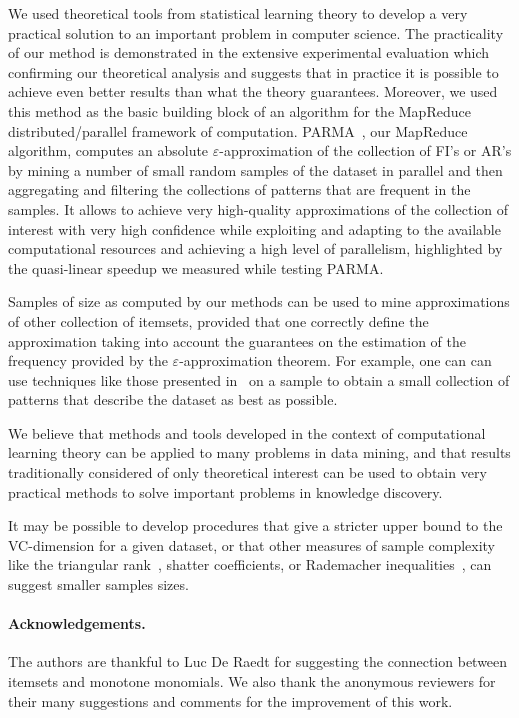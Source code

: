 We used theoretical tools from statistical learning theory to develop a very
practical solution to an important problem in computer science. The practicality
of our method is demonstrated in the extensive experimental evaluation which
confirming our theoretical analysis and suggests that in practice it is possible
to achieve even better results than what the theory guarantees. Moreover, we
used this method as the basic building block of an algorithm for the
MapReduce~\cite{DeanS04} distributed/parallel framework of computation.
PARMA~\cite{RiondatoDFU12}, our MapReduce algorithm, computes an absolute
$\varepsilon$-approximation of the collection of FI's or AR's by mining a number
of small random samples of the dataset in parallel and then aggregating and
filtering the collections of patterns that are frequent in the samples. It
allows to achieve very high-quality approximations of the collection of interest
with very high confidence while exploiting and adapting to the available
computational resources and achieving a high level of parallelism, highlighted 
by the quasi-linear speedup we measured while testing PARMA.

Samples of size as computed by our methods can be used to mine approximations
of other collection of itemsets, provided that one correctly define the
approximation taking into account the guarantees on the estimation of the
frequency provided by the $\varepsilon$-approximation theorem. For example, one
can can use techniques like those presented in~\cite{MampaeyTV11} on a sample
to obtain a small collection of patterns that describe the dataset as best as
possible.

We believe that methods and tools developed in the context of computational
learning theory can be applied to many problems in data mining, and that results
traditionally considered of only theoretical interest can be used to obtain very
practical methods to solve important problems in knowledge discovery.

It may be possible to develop procedures that give a stricter upper bound to the
VC-dimension for a given dataset, or that other measures of sample complexity
like the triangular rank~\cite{NewmanR12}, shatter coefficients, or Rademacher
inequalities~\cite{BoucheronBL05}, can suggest smaller samples sizes. 

\paragraph{Acknowledgements.} The authors are thankful to Luc De Raedt for
suggesting the connection between itemsets and monotone monomials. We also thank
the anonymous reviewers for their many suggestions and comments for the
improvement of this work.

